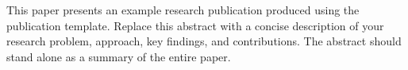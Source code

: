 

This paper presents an example research publication produced using the
publication template. Replace this abstract with a concise description of
your research problem, approach, key findings, and contributions.
The abstract should stand alone as a summary of the entire paper.
